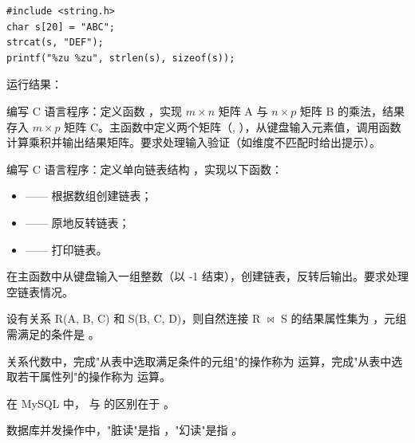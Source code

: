 \documentclass[a4paper,11pt]{article}
\begin{document}
\q
\begin{lstlisting}[language={[custom]C}]
#include <string.h>
char s[20] = "ABC";
strcat(s, "DEF");
printf("%zu %zu", strlen(s), sizeof(s));
\end{lstlisting}
运行结果：\underline{\hspace{3cm}}


\pq 编写 C 语言程序：定义函数 ，实现 $m \times n$ 矩阵 A 与 $n \times p$ 矩阵 B 的乘法，结果存入 $m \times p$ 矩阵 C。主函数中定义两个矩阵（, ），从键盘输入元素值，调用函数计算乘积并输出结果矩阵。要求处理输入验证（如维度不匹配时给出提示）。

\anslines{5cm}

\pq 编写 C 语言程序：定义单向链表结构 ，实现以下函数：
\begin{itemize}
  \item {} —— 根据数组创建链表；
  \item {} —— 原地反转链表；
  \item {} —— 打印链表。
\end{itemize}
在主函数中从键盘输入一组整数（以 -1 结束），创建链表，反转后输出。要求处理空链表情况。

\anslines{6cm}



\q 设有关系 R(A, B, C) 和 S(B, C, D)，则自然连接 R $\bowtie$ S 的结果属性集为 \fillblank ，元组需满足的条件是 \fillblank 。

\q 关系代数中，完成"从表中选取满足条件的元组"的操作称为 \fillblank 运算，完成"从表中选取若干属性列"的操作称为 \fillblank 运算。

\q 在 MySQL 中， 与  的区别在于 \fillblank 。

\q 数据库并发操作中，"脏读"是指 \fillblank ，"幻读"是指 \fillblank 。
\end{document}

